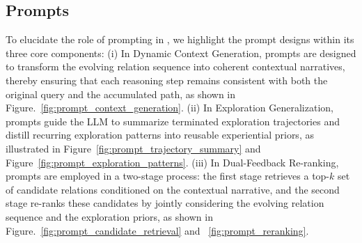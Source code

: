 \subsection{Prompts}

To elucidate the role of prompting in \method{}, we highlight the prompt designs within its three core components: (i) In Dynamic Context Generation, prompts are designed to transform the evolving relation sequence into coherent contextual narratives, thereby ensuring that each reasoning step remains consistent with both the original query and the accumulated path, as shown in Figure.~\ref{fig:prompt_context_generation}. (ii) In Exploration Generalization,
prompts guide the LLM to summarize terminated exploration trajectories and distill recurring exploration patterns into reusable experiential priors, as illustrated in Figure~\ref{fig:prompt_trajectory_summary} and Figure~\ref{fig:prompt_exploration_patterns}. (iii) In Dual-Feedback Re-ranking, prompts are employed in a two-stage process: the first stage retrieves a top-$k$ set of candidate relations conditioned on the contextual narrative, and the second stage re-ranks these candidates by jointly considering the evolving relation sequence and the exploration priors, as shown in Figure.~\ref{fig:prompt_candidate_retrieval} and ~\ref{fig:prompt_reranking}.

\newpage

